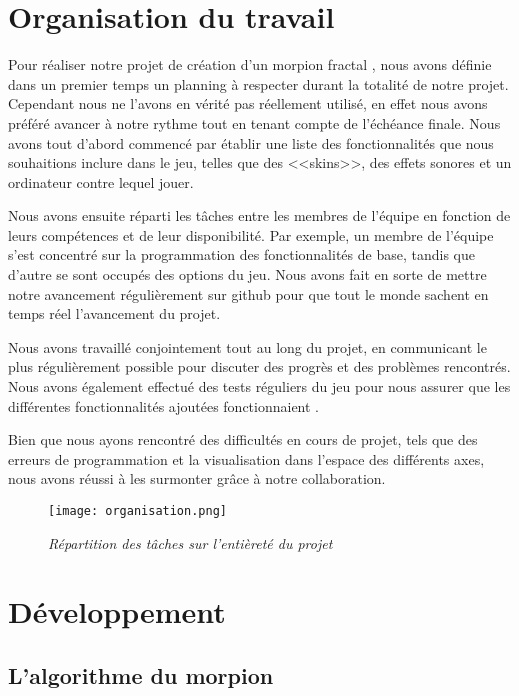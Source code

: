 \documentclass[12pt,a4paper]{article}
\begin{document}
    \section{Organisation du travail}
    Pour réaliser notre projet de création d'un morpion fractal , nous avons définie dans un premier temps un planning à respecter durant la totalité de notre projet. Cependant nous ne l'avons en vérité pas réellement utilisé, en effet nous avons préféré avancer à notre rythme tout en tenant compte de l'échéance finale. Nous avons  tout d'abord commencé par établir une liste des fonctionnalités que nous souhaitions inclure dans le jeu, telles que des <<skins>>, des effets sonores et un ordinateur contre lequel jouer.
    
    Nous avons ensuite réparti les tâches entre les membres de l'équipe en fonction de leurs compétences et de leur disponibilité. Par exemple, un membre de l'équipe s'est concentré sur la programmation des fonctionnalités de base, tandis que d'autre se sont occupés des options du jeu. Nous avons fait en sorte de mettre notre avancement régulièrement sur github pour que tout le monde sachent en temps réel l'avancement du projet.

    Nous avons travaillé conjointement tout au long du projet, en communicant le plus régulièrement possible pour discuter des progrès et des problèmes rencontrés. Nous avons également effectué des tests réguliers du jeu pour nous assurer que les différentes fonctionnalités ajoutées fonctionnaient .

    Bien que nous ayons rencontré des difficultés en cours de projet, tels que des erreurs de programmation et la visualisation dans l'espace des différents axes, nous avons réussi à les surmonter grâce à notre collaboration.

    \begin{figure}[h!]
    \begin{center}
    \texttt{[image: organisation.png]}\\
    \caption{{\emph{Répartition des tâches sur l'entièreté du projet}}}
    \label{Regroupement (ou clustering)}
    \end{center}
    \end{figure}

    \section{Développement}

    \subsection{L'algorithme du morpion}
\end{document}
